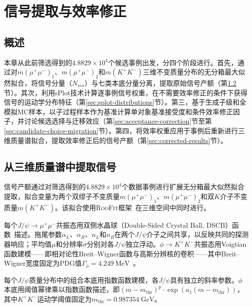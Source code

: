 \chapter{信号提取与效率修正}
\label{chap:signal-efficiency}

\section{概述}
\label{sec:signal-efficiency-overview}

本章从此前筛选得到的$4.8829\times10^4$个候选事例出发，分四个阶段进行。首先，通过对$m(\mu^+\mu^-)_1$、$m(\mu^+\mu^-)_2$和$m(K^+K^-)$三维不变质量分布的无分箱最大似然拟合，将信号分量（$N_{sss}$）与七类本底分量分离，提取原始信号产额（第\ref{sec:signal-extraction}节）。其次，利用sPlot技术计算逐事例信号权重，在不需要效率修正的条件下获得信号的运动学分布特征（第\ref{sec:splot-distributions}节）。第三，基于生成子级和全模拟MC样本，以\DPSone 子过程样本作为基准计算单对象基准接受度和条件效率修正因子，并讨论候选选择与迁移效应（第\ref{sec:acceptance-correction}节至第\ref{sec:candidate-choice-migration}节）。第四，将\DPSone 效率权重应用于事例后重新进行三维质量谱拟合，提取效率修正后的信号产额（第\ref{sec:corrected-results}节）。

\section{从三维质量谱中提取信号}
\label{sec:signal-extraction}

信号产额通过对筛选得到的$4.8829\times10^4$个数据事例进行扩展无分箱最大似然拟合提取，拟合变量为两个双缪子不变质量$m(\mu^+\mu^-)_1$、$m(\mu^+\mu^-)_2$和双$K$介子不变质量$m(K^+K^-)$。该拟合使用\textsc{RooFit}框架~\cite{Verkerke:2003ir}在三维空间中同时进行。

每个$J/\psi \to \mu^+\mu^-$共振态用双侧水晶球（Double-Sided Crystal Ball, DSCB）函数~\cite{Oreglia:1980cs}描述。拖尾参数$\alpha_L$、$\alpha_R$、$n_L$和$n_R$在两个$J/\psi$介子之间共享，以反映共同的探测器响应；平均值$\mu$和分辨率$\sigma$分别对各$J/\psi$独立浮动。$\phi \to K^+K^-$共振态用Voigtian函数建模——即相对论性Breit--Wigner函数与高斯分辨核的卷积——其中Breit--Wigner宽度固定为PDG值$\Gamma_\phi = \SI{4.249}{\mega\eV}$~\cite{PDG2024}。

每个$J/\psi$质量分布中的组合本底用指数函数建模，各$J/\psi$具有独立的斜率参数。$\phi$本底用阈值幂律乘以指数函数描述，即$(m - m_{\mathrm{thr}})^p \cdot \exp(a_1(m - m_{\mathrm{thr}}))$，其中$K^+K^-$运动学阈值固定为$m_{\mathrm{thr}} = \SI{0.987354}{\giga\eV}$。

